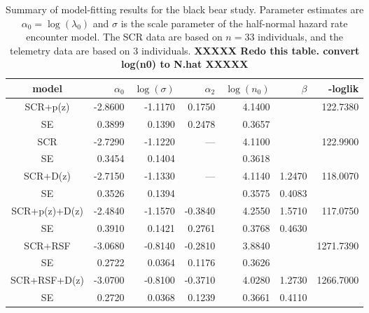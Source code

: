 \begin{table}
\centering
\caption{
Summary of model-fitting results for the black bear study. Parameter
estimates are $\alpha_{0} = \log(\lambda_{0})$ and $\sigma$ is the
scale parameter of the half-normal hazard rate encounter model.
The SCR data are based on $n=33$ individuals, and the telemetry data
are based on 3 individuals.
{\bf XXXXX Redo this table. convert log(n0) to N.hat XXXXX}
}
\begin{tabular}{c|rrrrrr}
\hline \hline
model         & $\alpha_0$ & $\log(\sigma)$ & $\alpha_{2}$ & $\log(n_{0})$ & 
$\beta$       & -loglik                                                                         \\ \hline
SCR+p(z)      & -2.8600    & -1.1170        & 0.1750       & 4.1400        &        & 122.7380  \\
   SE         & 0.3899     & 0.1390         & 0.2478       & 0.3657        &        &           \\
 SCR          & -2.7290    & -1.1220        & ---          & 4.1100        &        & 122.9900  \\
   SE         & 0.3454     & 0.1404         &              & 0.3618        &        &           \\
SCR+D(z)      & -2.7150    & -1.1330        & ---          & 4.1140        & 1.2470 & 118.0070  \\
   SE         & 0.3526     & 0.1394         &              & 0.3575        & 0.4083 &           \\
SCR+p(z)+D(z) & -2.4840    & -1.1570        & -0.3840      & 4.2550        & 1.5710 & 117.0750  \\
   SE         & 0.3910     & 0.1421         & 0.2761       & 0.3768        & 0.4630 &           \\
SCR+RSF       & -3.0680    & -0.8140        & -0.2810      & 3.8840        &        & 1271.7390 \\
   SE         & 0.2722     & 0.0364         & 0.1176       & 0.3626        &        &           \\
SCR+RSF+D(z)  & -3.0700    & -0.8100        & -0.3710      & 4.0280        & 1.2730 & 1266.7000 \\
   SE         & 0.2720     & 0.0368         & 0.1239       & 0.3661        & 0.4110 &           \\
\hline
\end{tabular}
\label{tab.nyresults}
\end{table}



